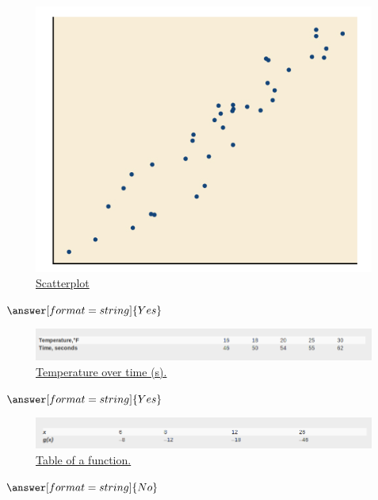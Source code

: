 \documentclass{ximera}
\begin{document}
\begin{question}
\begin{figure}
\includegraphics[scale=0.4]{positiveR.png}
\caption{\href{https://cnx.org/contents/mwjClAV_@8.12:6dX4RGdg@12/Fitting-Linear-Models-to-Data}{Scatterplot}}
\end{figure}
$\answer[format=string]{Yes}$
\end{question}

\begin{question}
\begin{figure}
\includegraphics[scale=0.4]{temperature.png}
\caption{\href{https://cnx.org/contents/mwjClAV_@8.12:6dX4RGdg@12/Fitting-Linear-Models-to-Data}{Temperature over time (s).}}
\end{figure}
$\answer[format=string]{Yes}$
\end{question}

\begin{question}
\begin{figure}
\includegraphics[scale=0.4]{tableFunction.png}
\caption{\href{https://cnx.org/contents/mwjClAV_@8.12:6dX4RGdg@12/Fitting-Linear-Models-to-Data}{Table of a function.}}
\end{figure}
$\answer[format=string]{No}$
\end{question}
\end{document}
